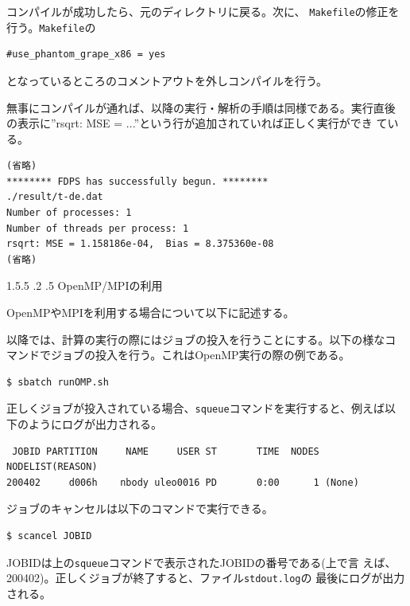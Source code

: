 \documentclass[12pt,a4paper,dvipdfmx]{jarticle}
\makeatletter
\newcommand{\subsubsubsection}{\@startsection{paragraph}{4}{\z@}%
{1.5\baselineskip \@plus.5\dp0 \@minus.2\dp0}%
{.5\baselineskip \@plus2.3\dp0}%
{\reset@font\normalsize\bfseries}
}
\makeatother
\begin{document}
コンパイルが成功したら、元のディレクトリに戻る。次に、
\texttt{Makefile}の修正を行う。\texttt{Makefile}の
\begin{screen}
\begin{verbatim}
#use_phantom_grape_x86 = yes
\end{verbatim}
\end{screen}
となっているところのコメントアウトを外しコンパイルを行う。

無事にコンパイルが通れば、以降の実行・解析の手順は同様である。実行直後
の表示に''rsqrt: MSE = ...''という行が追加されていれば正しく実行ができ
ている。
\begin{screen}
\begin{verbatim}
(省略)
******** FDPS has successfully begun. ********
./result/t-de.dat
Number of processes: 1
Number of threads per process: 1
rsqrt: MSE = 1.158186e-04,  Bias = 8.375360e-08
(省略)
\end{verbatim}
\end{screen}

\subsubsubsection{OpenMP/MPIの利用}

OpenMPやMPIを利用する場合について以下に記述する。

以降では、計算の実行の際にはジョブの投入を行うことにする。以下の様なコ
マンドでジョブの投入を行う。これはOpenMP実行の際の例である。
\begin{screen}
\begin{verbatim}
$ sbatch runOMP.sh
\end{verbatim}
\end{screen}
正しくジョブが投入されている場合、\texttt{squeue}コマンドを実行すると、例えば以
下のようにログが出力される。
\begin{screen}
\begin{verbatim}
 JOBID PARTITION     NAME     USER ST       TIME  NODES NODELIST(REASON)
200402     d006h    nbody uleo0016 PD       0:00      1 (None)
\end{verbatim}
\end{screen}
ジョブのキャンセルは以下のコマンドで実行できる。
\begin{screen}
\begin{verbatim}
$ scancel JOBID
\end{verbatim}
\end{screen}
JOBIDは上の\texttt{squeue}コマンドで表示されたJOBIDの番号である(上で言
えば、200402)。正しくジョブが終了すると、ファイル\texttt{stdout.log}の
最後にログが出力される。
\end{document}
